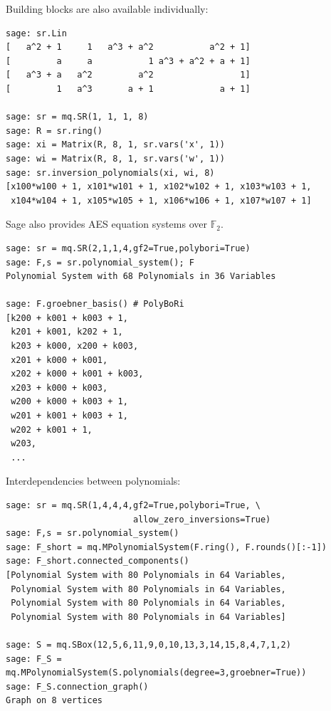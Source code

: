 \documentclass[10pt]{beamer}
\newcommand{\field}[1]{\mathbb{#1}}
\newcommand{\F}{\field{F}}
\begin{document}
\begin{frame}
Building blocks are also available individually:

\begin{lstlisting}
sage: sr.Lin
[   a^2 + 1     1   a^3 + a^2           a^2 + 1]
[         a     a           1 a^3 + a^2 + a + 1]
[   a^3 + a   a^2         a^2                 1]
[         1   a^3       a + 1             a + 1]

sage: sr = mq.SR(1, 1, 1, 8)
sage: R = sr.ring()
sage: xi = Matrix(R, 8, 1, sr.vars('x', 1))
sage: wi = Matrix(R, 8, 1, sr.vars('w', 1))
sage: sr.inversion_polynomials(xi, wi, 8)
[x100*w100 + 1, x101*w101 + 1, x102*w102 + 1, x103*w103 + 1,
 x104*w104 + 1, x105*w105 + 1, x106*w106 + 1, x107*w107 + 1]
\end{lstlisting}

\framebreak

Sage also provides AES equation systems over $\F_2$.

\begin{lstlisting}
sage: sr = mq.SR(2,1,1,4,gf2=True,polybori=True)
sage: F,s = sr.polynomial_system(); F
Polynomial System with 68 Polynomials in 36 Variables

sage: F.groebner_basis() # PolyBoRi
[k200 + k001 + k003 + 1,
 k201 + k001, k202 + 1,
 k203 + k000, x200 + k003,
 x201 + k000 + k001,
 x202 + k000 + k001 + k003,
 x203 + k000 + k003,
 w200 + k000 + k003 + 1,
 w201 + k001 + k003 + 1,
 w202 + k001 + 1,
 w203,
 ...
\end{lstlisting}

\framebreak

Interdependencies between polynomials:

\begin{lstlisting}
sage: sr = mq.SR(1,4,4,4,gf2=True,polybori=True, \
                         allow_zero_inversions=True)
sage: F,s = sr.polynomial_system()
sage: F_short = mq.MPolynomialSystem(F.ring(), F.rounds()[:-1])
sage: F_short.connected_components()
[Polynomial System with 80 Polynomials in 64 Variables,
 Polynomial System with 80 Polynomials in 64 Variables,
 Polynomial System with 80 Polynomials in 64 Variables,
 Polynomial System with 80 Polynomials in 64 Variables]

sage: S = mq.SBox(12,5,6,11,9,0,10,13,3,14,15,8,4,7,1,2)
sage: F_S = mq.MPolynomialSystem(S.polynomials(degree=3,groebner=True))
sage: F_S.connection_graph()
Graph on 8 vertices
\end{lstlisting}

\end{frame}
\end{document}
